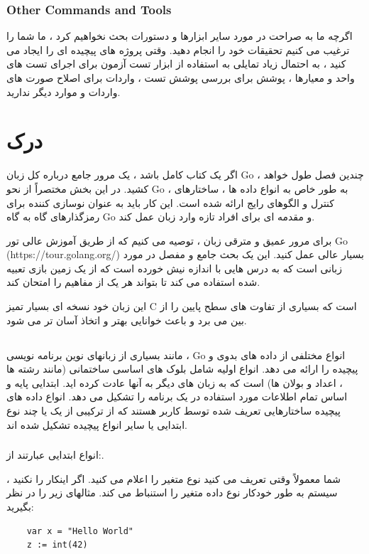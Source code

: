 \documentclass[12pt]{book}
\begin{document}
\subsubsection{Other Commands and Tools}
اگرچه ما به صراحت در مورد سایر ابزارها و دستورات بحث نخواهیم کرد ، ما شما را ترغیب می کنیم تحقیقات خود را انجام دهید. وقتی پروژه های پیچیده ای را ایجاد می کنید ، به احتمال زیاد تمایلی به استفاده از ابزار تست آزمون برای اجرای تست های واحد و معیارها ، پوشش برای بررسی پوشش تست ، واردات برای اصلاح صورت های واردات و موارد دیگر ندارید.
\section{درک }
اگر یک کتاب کامل باشد ، یک مرور جامع درباره کل زبان Go ، چندین فصل طول خواهد کشید. در این بخش مختصراً از نحو Go ، به طور خاص به انواع داده ها ، ساختارهای کنترل و الگوهای رایج ارائه شده است. این کار باید به عنوان نوسازی کننده برای رمزگذارهای گاه به گاه Go و مقدمه ای برای افراد تازه وارد زبان عمل کند.

برای مرور عمیق و مترقی زبان ، توصیه می کنیم که از طریق آموزش عالی تور Go (https://tour.golang.org/) بسیار عالی عمل کنید. این یک بحث جامع و مفصل در مورد زبانی است که به درس هایی با اندازه نیش خورده است که از یک زمین بازی تعبیه شده استفاده می کند تا بتواند هر یک از مفاهیم را امتحان کند.

این زبان خود نسخه ای بسیار تمیز C است که بسیاری از تفاوت های سطح پایین را از بین می برد و باعث خوانایی بهتر و اتخاذ آسان تر می شود.
\subsection{}
مانند بسیاری از زبانهای نوین برنامه نویسی ، Go انواع مختلفی از داده های بدوی و پیچیده را ارائه می دهد. انواع اولیه شامل بلوک های اساسی ساختمانی (مانند رشته ها ، اعداد و بولان ها) است که به زبان های دیگر به آنها عادت کرده اید. ابتدایی پایه و اساس تمام اطلاعات مورد استفاده در یک برنامه را تشکیل می دهد. انواع داده های پیچیده ساختارهایی تعریف شده توسط کاربر هستند که از ترکیبی از یک یا چند نوع ابتدایی یا سایر انواع پیچیده تشکیل شده اند.
\subsubsection{}
انواع ابتدایی عبارتند از:.

شما معمولاً وقتی تعریف می کنید نوع متغیر را اعلام می کنید. اگر اینکار را نکنید ، سیستم به طور خودکار نوع داده متغیر را استنباط می کند. مثالهای زیر را در نظر بگیرید:
\begin{latin}
	\begin{lstlisting}
	var x = "Hello World"
	z := int(42)
	\end{lstlisting}
\end{latin}
\end{document}
